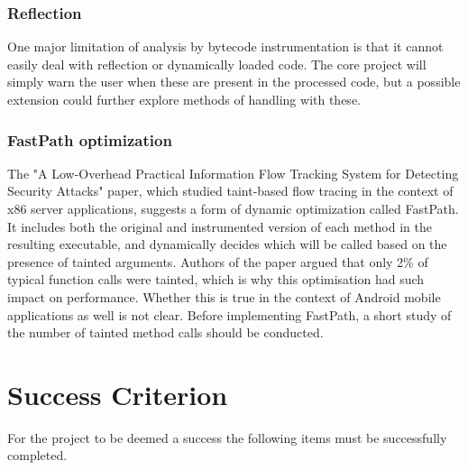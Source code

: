 \documentclass[12pt]{article}
\begin{document}
\subsubsection*{Reflection}

One major limitation of analysis by bytecode instrumentation is that it 
cannot easily deal with reflection or dynamically loaded code. The core
project will simply warn the user when these are present in the processed
code, but a possible extension could further explore methods of handling 
with these.

\subsubsection*{FastPath optimization}

The "A Low-Overhead Practical Information Flow Tracking System for 
Detecting Security Attacks" paper, which studied taint-based flow tracing 
in the context of x86 server applications, suggests a form of dynamic 
optimization called FastPath. It includes both the original and 
instrumented version of each method in the resulting executable, and
dynamically decides which will be called based on the presence of tainted 
arguments. Authors of the paper argued that only 2\% of typical 
function calls were tainted, which is why this optimisation had such  
impact on performance. Whether this is true in the context of Android mobile
applications as well is not clear. Before implementing FastPath, a short 
study of the number of tainted method calls should be conducted.

\section*{Success Criterion}

For the project to be deemed a success the following items must be
successfully completed.
\end{document}
